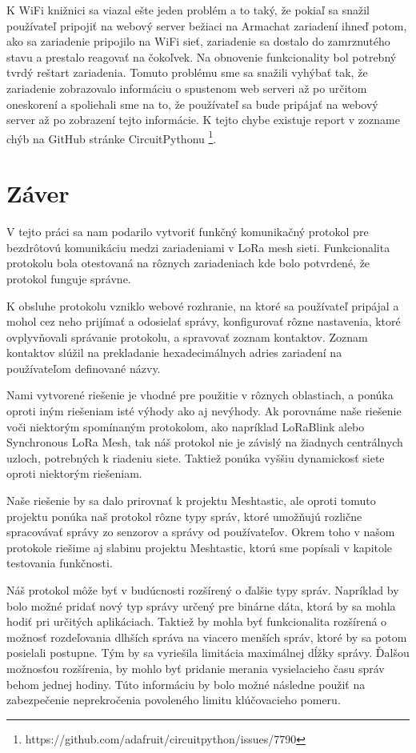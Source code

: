 \documentclass[slovak,master]{diploma}
\begin{document}
K WiFi knižnici sa viazal ešte jeden problém a to taký, že pokiaľ sa snažil používateľ pripojiť na webový server bežiaci na Armachat zariadení ihneď potom, ako sa zariadenie pripojilo na WiFi sieť, 
zariadenie sa dostalo do zamrznutého stavu a prestalo reagovať na čokoľvek. Na obnovenie funkcionality bol potrebný tvrdý reštart zariadenia. 
Tomuto problému sme sa snažili vyhýbať tak, že zariadenie zobrazovalo informáciu o spustenom web serveri až po určitom oneskorení a spoliehali sme na to, že používateľ 
sa bude pripájať na webový server až po zobrazení tejto informácie. K tejto chybe existuje report v zozname chýb na GitHub stránke CircuitPythonu \footnote[5]{https://github.com/adafruit/circuitpython/issues/7790}.

\chapter{Záver}
V tejto práci sa nam podarilo vytvoriť funkčný komunikačný protokol pre bezdrôtovú komunikáciu medzi zariadeniami v LoRa mesh sieti.
Funkcionalita protokolu bola otestovaná na rôznych zariadeniach kde bolo potvrdené, že protokol funguje správne. 

K obsluhe protokolu vzniklo webové rozhranie, na ktoré sa používateľ pripájal a mohol cez neho prijímať a odosielať správy, konfigurovať 
rôzne nastavenia, ktoré ovplyvňovali správanie protokolu, a spravovať zoznam kontaktov. Zoznam kontaktov slúžil na prekladanie 
hexadecimálnych adries zariadení na používateľom definované názvy.

Nami vytvorené riešenie je vhodné pre použitie v rôznych oblastiach, a ponúka oproti iným riešeniam isté výhody ako aj nevýhody.
Ak porovnáme naše riešenie voči niektorým spomínaným protokolom, ako napríklad LoRaBlink alebo Synchronous LoRa Mesh, 
tak náš protokol nie je závislý na žiadnych centrálnych uzloch, potrebných k riadeniu siete. Taktiež ponúka vyššiu dynamickosť siete oproti 
niektorým riešeniam.

Naše riešenie by sa dalo prirovnať k projektu Meshtastic, ale oproti tomuto projektu ponúka naš protokol rôzne typy správ, ktoré umožňujú 
rozlične spracovávať správy zo senzorov a správy od používateľov. Okrem toho v našom protokole riešime aj slabinu projektu Meshtastic, ktorú sme 
popísali v kapitole testovania funkčnosti.

Náš protokol môže byť v budúcnosti rozšírený o ďalšie typy správ. Napríklad by bolo možné pridať nový typ správy určený pre binárne dáta, 
ktorá by sa mohla hodiť pri určitých aplikáciach. 
Taktiež by mohla byť funkcionalita rozšírená o možnosť rozdeľovania dlhších správa na viacero menších správ, ktoré by sa potom posielali postupne. Tým by sa 
vyriešila limitácia maximálnej dĺžky správy. Ďalšou možnosťou rozšírenia, by mohlo byť pridanie merania vysielacieho času správ behom jednej hodiny. Túto informáciu 
by bolo možné následne použiť na zabezpečenie neprekročenia povoleného limitu klúčovacieho pomeru.
\end{document}

